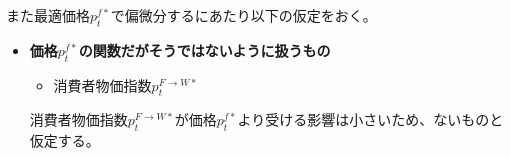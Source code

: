 また最適価格\(p_t^{f*}\)で偏微分するにあたり以下の仮定をおく。
\begin{itemize}
    \item
    \label{itm:chapter3_assumptions_price_optimization_foreign_caliculation_assumption}
        \textbf{価格\(p_t^{f*}\)の関数だがそうではないように扱うもの}
        \begin{itemize}
            \item 消費者物価指数\(p_t^{F\to W*}\)
        \end{itemize}
        消費者物価指数\(p_t^{F\to W*}\)が価格\(p_t^{f*}\)より受ける影響は小さいため、ないものと仮定する。
\end{itemize}